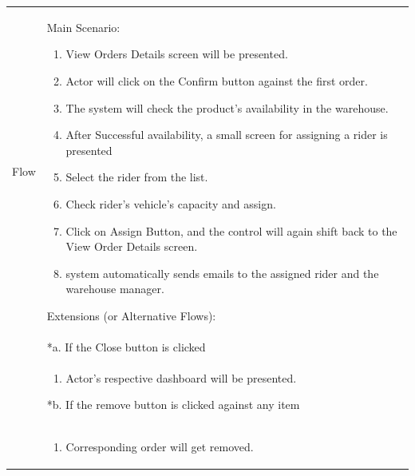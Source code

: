 \documentclass[12pt,a4paper]{report}
\begin{document}
\begin{tabular}{ | m{3cm} | m{12cm}| } \hline

Flow & Main Scenario:



\begin{enumerate}



\item View Orders Details screen will be presented.

\item Actor will click on the Confirm button against the first order.

\item The system will check the product's availability in the warehouse.

\item After Successful availability, a small screen for assigning a rider is presented

\item Select the rider from the list.

\item Check rider's vehicle's capacity and assign.

\item Click on Assign Button, and the control will again shift back to the View Order Details screen.

\item system automatically sends emails to the assigned rider and the warehouse manager.

\end{enumerate}



Extensions (or Alternative Flows):\\

& *a. If the Close button is clicked \\

& \begin{enumerate}

		\item Actor's respective dashboard will be presented.

	\end{enumerate}

*b. If the remove button is clicked against any item\\

& \begin{enumerate}

		\item Corresponding order will get removed.


\end{enumerate}
\end{tabular}
\end{document}
